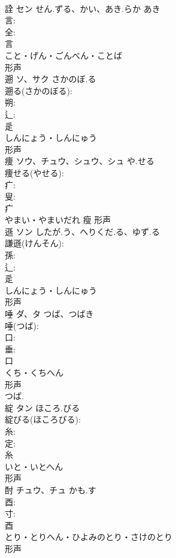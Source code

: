\documentclass[8pt]{extreport}
\begin{document}
\begin{CJK}{UTF8}{min}
\\	詮	セン	せん.ずる、かい、あき.らか	あき	
\\	言: 
\\	全: 
\\	言	
\\	こと・げん・ごんべん・ことば	
\\	形声 
\\	遡	ソ、サク	さかのぼ.る		
\\	遡る(さかのぼる): 
\\	朔: 
\\	辶: 
\\	辵	
\\	しんにょう・しんにゅう	
\\	形声 
\\	痩	ソウ、チュウ、シュウ、シュ	や.せる		
\\	痩せる(やせる): 
\\	疒: 
\\	叟: 
\\	疒	
\\	やまい・やまいだれ	瘦	形声 
\\	遜	ソン	したが.う、へりくだ.る、ゆず.る		
\\	謙遜(けんそん): 
\\	孫: 
\\	辶: 
\\	辵	
\\	しんにょう・しんにゅう	
\\	形声 
\\	唾	ダ、タ	つば、つばき		
\\	唾(つば): 
\\	口: 
\\	垂: 
\\	口	
\\	くち・くちへん	
\\	形声 
\\	つば.
\\	綻	タン	ほころ.びる		
\\	綻びる(ほころびる): 
\\	糸: 
\\	定: 
\\	糸	
\\	いと・いとへん	
\\	形声 
\\	酎	チュウ、チュ	かも.す		
\\	酉: 
\\	寸: 
\\	酉	
\\	とり・とりへん・ひよみのとり・さけのとり	
\\	形声 

\end{CJK}
\end{document}
